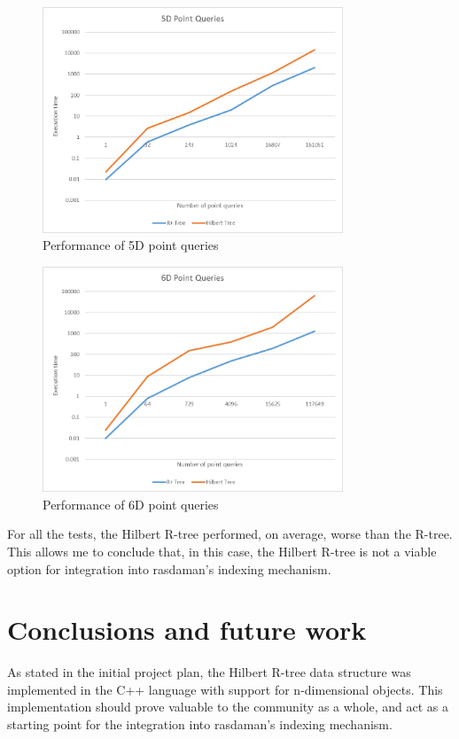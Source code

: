 \documentclass[11pt, a4paper, oneside]{article}
\newcommand{\rtree}{R-tree}
\begin{document}
\begin{enumerate}
\begin{figure}[H]
  \centering
    \includegraphics[width=0.8\textwidth]{img/point5d}
      \caption{Performance of 5D point queries}
  \label{fig:point5D}
\end{figure}

\begin{figure}[H]
  \centering
    \includegraphics[width=0.8\textwidth]{img/point6d}
      \caption{Performance of 6D point queries}
  \label{fig:point6D}
\end{figure}
\end{enumerate}

For all the tests, the Hilbert R-tree performed, on average, worse than the \rtree . This allows me to conclude that, in this case, the Hilbert R-tree is not a viable option for integration into rasdaman's indexing mechanism.

\section{Conclusions and future work}
\label{sec:conclusions}
As stated in the initial project plan, the Hilbert R-tree data structure was implemented in the C++ language with support for n-dimensional objects. This implementation should prove valuable to the community as a whole, and act as a starting point for the integration into rasdaman's indexing mechanism.
\end{document}
